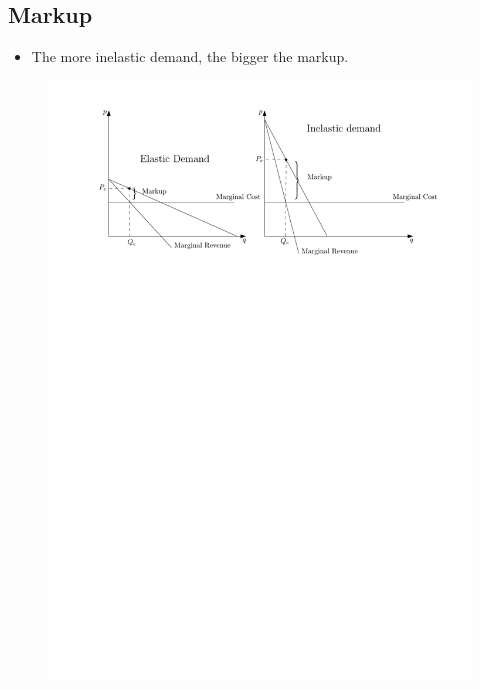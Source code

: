 \documentclass{article}
\begin{document}
\subsection{Markup}
\begin{itemize}
    \item The more inelastic demand, the bigger the markup. 
\end{itemize}
\begin{figure}[!htb]
    \centering
    \includegraphics[]{figs/markup} 
\end{figure}



\end{document}
